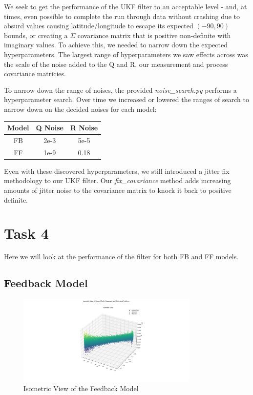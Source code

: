 \documentclass{article}
\begin{document}
We seek to get the performance of the UKF filter to an acceptable level - and, at times, even possible to complete the run through data without crashing due to absurd values causing latitude/longitude to escape its expected $(-90, 90)$ bounds, or creating a $\Sigma$ covariance matrix that is positive non-definite with imaginary values. To achieve this, we needed to narrow down the expected hyperparameters. The largest range of hyperparameters we saw effects across was the scale of the noise added to the Q and R, our measurement and process covariance matricies.

To narrow down the range of noises, the provided \textit{noise\_search.py} performs a hyperparameter search. Over time we increased or lowered the ranges of search to narrow down on the decided noises for each model:

\begin{table}[H]
    \centering
    \begin{tabular}{|c|c|c|}
        \hline
        Model & Q Noise & R Noise \\
        \hline
        FB    & 2e-3    & 5e-5    \\
        FF    & 1e-9    & 0.18    \\
        \hline
    \end{tabular}
\end{table}

Even with these discovered hyperparameters, we still introduced a jitter fix methodology to our UKF filter. Our \textit{fix\_covariance} method adds increasing amounts of jitter noise to the covariance matrix to knock it back to positive definite.

\section*{Task 4}

Here we will look at the performance of the filter for both FB and FF models.

\subsection*{Feedback Model}

\begin{figure}[H]
    \centering
    \includegraphics[width=0.8\textwidth]{./imgs/FB_isometric.png}
    \caption{Isometric View of the Feedback Model}
\end{figure}
\end{document}
